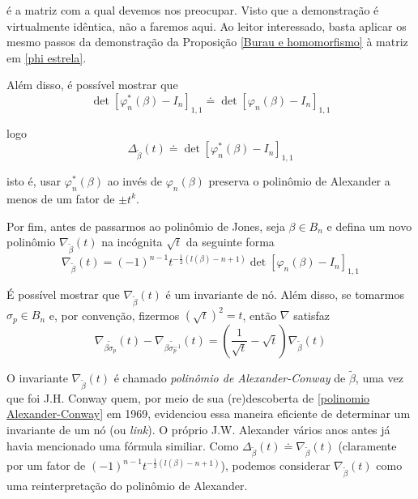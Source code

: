 	\par\vspace{0.3cm} é a matriz com a qual devemos nos preocupar. Visto que a demonstração é virtualmente idêntica, não a faremos aqui. Ao leitor interessado, basta aplicar os mesmo passos da demonstração da Proposição \eqref{Burau e homomorfismo} à matriz em \eqref{phi estrela}.
	\par\vspace{0.3cm} Além disso, é possível mostrar que 
	\begin{equation*}
	\det[\varphi_n^\ast(\beta) - I_n]_{1,1}\doteq\det[\varphi_n(\beta) - I_n]_{1,1}
	\end{equation*}	
	\par\vspace{0.3cm} logo
	\begin{equation*}
	\Delta_{\widetilde{\beta}}(t) \doteq \det[\varphi_n^\ast(\beta) - I_n]_{1,1}
	\end{equation*}
	\par\vspace{0.3cm} isto é, usar $\varphi_n^\ast(\beta)$ ao invés de $\varphi_n(\beta)$ preserva o polinômio de Alexander a menos de um fator de $\pm t^k$. 
	\par\vspace{0.3cm} Por fim, antes de passarmos ao polinômio de Jones, seja $\beta\in B_n$ e defina um novo polinômio $\nabla_{\widetilde{\beta}}(t)$ na incógnita $\sqrt{t}$ da seguinte forma
	\begin{equation*}
	\nabla_{\widetilde{\beta}}(t) = (-1)^{n-1}t^{-\frac{1}{2}(l(\beta)-n+1)}\det[\varphi_n(\beta) - I_n]_{1,1}
	\end{equation*}
	\par\vspace{0.3cm} É possível mostrar que $\nabla_{\widetilde{\beta}}(t)$ é um invariante de nó. Além disso, se tomarmos $\sigma_p\in B_n$ e, por convenção, fizermos $(\sqrt{t})^2 = t$, então $\nabla$ satisfaz
	\begin{equation}
	\label{polinomio Alexander-Conway}
	\nabla_{\widetilde{\beta\sigma_p}}(t) - \nabla_{\widetilde{\beta\sigma_p^{-1}}}(t) = \left(\frac{1}{\sqrt{t}}- \sqrt{t}\right)\nabla_{\widetilde{\beta}}(t)
	\end{equation}
	\par\vspace{0.3cm} O invariante $\nabla_{\widetilde{\beta}}(t)$ é chamado \textit{polinômio de Alexander-Conway} de $\widetilde{\beta}$, uma vez que foi J.H. Conway quem, por meio de sua (re)descoberta de \eqref{polinomio Alexander-Conway} em 1969, evidenciou essa maneira eficiente de determinar um invariante de um nó (ou \textit{link}). O próprio J.W. Alexander vários anos antes já havia mencionado uma fórmula similiar. Como $\Delta_{\widetilde{\beta}}(t)\doteq\nabla_{\widetilde{\beta}}(t)$ (claramente por um fator de $(-1)^{n-1}t^{-\frac{1}{2}(l(\beta)-n+1)}$), podemos considerar $\nabla_{\widetilde{\beta}}(t)$ como uma reinterpretação do polinômio de Alexander. 
